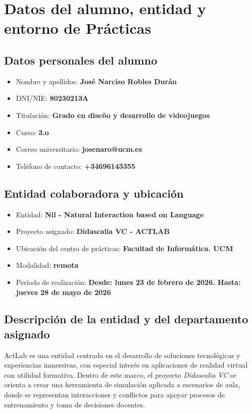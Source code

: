 \section{Datos del alumno, entidad y entorno de Prácticas}

\subsection{Datos personales del alumno}
\begin{itemize}[leftmargin=1.5em]
    \item Nombre y apellidos: \textbf{José Narciso Robles Durán}
    \item DNI/NIE: \textbf{80230213A}
    \item Titulación: \textbf{Grado en diseño y desarrollo de videojuegos}
    \item Curso: \textbf{3.o}
    \item Correo universitario: \textbf{josenaro@ucm.es}
    \item Teléfono de contacto: \textbf{+34696143355}
\end{itemize}

\subsection{Entidad colaboradora y ubicación}
\begin{itemize}[leftmargin=1.5em]
    \item Entidad: \textbf{Nil - Natural Interaction based on Language}
    \item Proyecto asignado: \textbf{Didascalia VC - ACTLAB}
    \item Ubicación del centro de prácticas: \textbf{Facultad de Informática. UCM}
    \item Modalidad: \textbf{remota}
    \item Período de realización: \textbf{Desde: lunes 23 de febrero de 2026. Hasta: jueves 28 de mayo de 2026}
\end{itemize}

\subsection{Descripción de la entidad y del departamento asignado}
ActLab es una entidad centrada en el desarrollo de soluciones tecnológicas y experiencias inmersivas, con especial interés en aplicaciones de realidad virtual con utilidad formativa. Dentro de este marco, el proyecto \textit{Didascalia VC} se orienta a crear una herramienta de simulación aplicada a escenarios de aula, donde se representan interacciones y conflictos para apoyar procesos de entrenamiento y toma de decisiones docentes.

